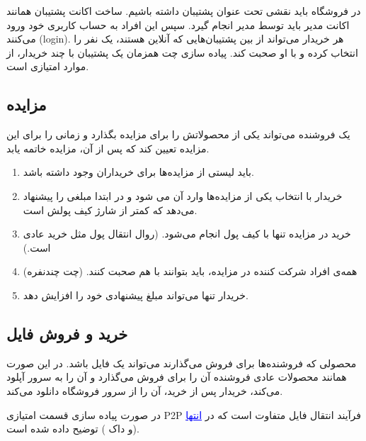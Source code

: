 \documentclass[]{article}
\begin{document}
در فروشگاه باید نقشی تحت عنوان پشتیبان داشته باشیم. ساخت اکانت پشتیبان همانند اکانت \textcolor{CustomColor}{مدیر} باید توسط مدیر انجام گیرد. سپس این افراد به حساب کاربری خود ورود می‌کنند (‌login).  هر خریدار می‌تواند از بین پشتیبان‌هایی که آنلاین هستند، یک نفر را انتخاب کرده و با او صحبت کند. پیاده سازی چت همزمان یک پشتیبان با چند خریدار، از موارد امتیازی است.

\subsection*{{\titr مزایده}}

یک فروشنده می‌تواند یکی از محصولاتش را برای مزایده بگذارد و زمانی را برای این مزایده تعیین کند که پس از آن، مزایده خاتمه یابد. 

\begin{enumerate}

\item
باید لیستی از مزایده‌ها برای خریداران وجود داشته باشد.

\item
خریدار با انتخاب یکی از مزایده‌ها وارد آن می شود و در ابتدا مبلغی را پیشنهاد می‌دهد که کمتر از شارژ کیف پولش است.

\item
خرید در مزایده تنها با کیف پول انجام می‌شود. (روال انتقال پول مثل خرید عادی است.)

\item
همه‌ی افراد شرکت کننده در مزایده، باید بتوانند با هم صحبت کنند. (چت چندنفره)

\item
خریدار تنها می‌تواند مبلغ پیشنهادی خود را افزایش دهد.


\end{enumerate}


\subsection*{{\titr خرید و فروش فایل}}

محصولی که فروشنده‌ها برای فروش می‌گذارند می‌تواند یک فایل باشد. در این صورت همانند محصولات عادی فروشنده آن را برای فروش می‌گذارد و آن را به سرور آپلود می‌کند، خریدار پس از خرید، آن را از سرور فروشگاه دانلود می‌کند.
 

 
در صورت پیاده سازی قسمت امتیازی P2P فرآیند انتقال فایل متفاوت است که در  \hyperref[subsec:p2p]{{\textcolor{blue}{\underline{انتها}}}} (\textcolor{CustomColor}{و داک }) توضیح داده شده است.
\end{document}
